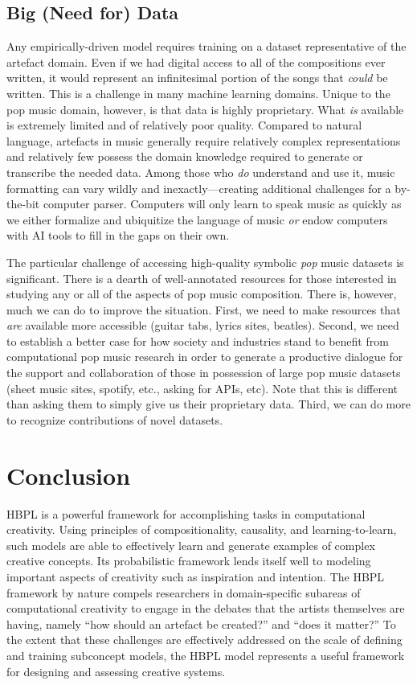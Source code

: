 \documentclass[phd,electronic,oneside,twosidetoc,letterpaper,chaptercenter,parttop,lol,lof,lot]{byumsphd}
\begin{document}
\subsection{Big (Need for) Data}

Any empirically-driven model requires training on a dataset representative of the artefact domain. Even if we had digital access to all of the compositions ever written, it would represent an infinitesimal portion of the songs that \emph{could} be written. This is a challenge in many machine learning domains. Unique to the pop music domain, however, is that data is highly proprietary. What \textit{is} available is extremely limited and of relatively poor quality. Compared to natural language, artefacts in music generally require relatively complex representations and relatively few possess the domain knowledge required to generate or transcribe the needed data. Among those who \textit{do} understand and use it, music formatting can vary wildly and inexactly---creating additional challenges for a by-the-bit computer parser. Computers will only learn to speak music as quickly as we either formalize and ubiquitize the language of music \textit{or} endow computers with AI tools to fill in the gaps on their own.

The particular challenge of accessing high-quality symbolic \emph{pop} music datasets is significant. There is a dearth of well-annotated resources for those interested in studying any or all of the aspects of pop music composition. There is, however, much we can do to improve the situation. First, we need to make resources that \textit{are} available more accessible (guitar tabs, lyrics sites, beatles). Second, we need to establish a better case for how society and industries stand to benefit from computational pop music research in order to generate a productive dialogue for the support and collaboration of those in possession of large pop music datasets (sheet music sites, spotify, etc., asking for APIs, etc). Note that this is different than asking them to simply give us their proprietary data. Third, we can do more to recognize contributions of novel datasets.

\section{Conclusion}

HBPL is a powerful framework for accomplishing tasks in computational creativity. Using principles of compositionality, causality, and learning-to-learn, such models are able to effectively learn and generate examples of complex creative concepts. Its probabilistic framework lends itself well to modeling important aspects of creativity such as inspiration and intention. The HBPL framework by nature compels researchers in domain-specific subareas of computational creativity to engage in the debates that the artists themselves are having, namely ``how should an artefact be created?'' and ``does it matter?'' To the extent that these challenges are effectively addressed on the scale of defining and training subconcept models, the HBPL model represents a useful framework for designing and assessing creative systems.
\end{document}
